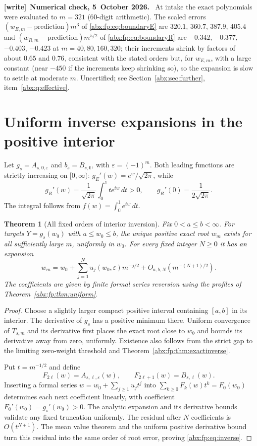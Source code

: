 \documentclass[11pt,letterpaper]{article}
\numberwithin{equation}{section}
\newtheorem{theorem}{Theorem}[section]
\theoremstyle{remark}\newtheorem{remark}[theorem]{Remark}
\newcommand{\eps}{\varepsilon}
\newcommand{\sq}{\sqrt{2\pi}}
\newenvironment{writenote}[1][]{\par\smallskip\begingroup\small
 \noindent\textbf{[write]}\if\relax\detokenize{#1}\relax\else~\textbf{#1.}\fi\ }%
 {\par\endgroup\smallskip}
\begin{document}
\begin{writenote}[Numerical check, 5~October 2026]
At intake the exact polynomials were evaluated to $m=321$ (60-digit arithmetic). The scaled errors $(w_{E,m}-\text{prediction})m^3$ of \eqref{abx:fp:eq:boundaryE} are $320.1$, $360.7$, $387.9$, $405.4$ and $(w_{R,m}-\text{prediction})m^{5/2}$ of \eqref{abx:fp:eq:boundaryR} are $-0.342$, $-0.377$, $-0.403$, $-0.423$ at $m=40,80,160,320$; their increments shrink by factors of about $0.65$ and $0.76$, consistent with the stated orders but, for $w_{E,m}$, with a large constant (near $-450$ if the increments keep shrinking so), so the expansion is slow to settle at moderate $m$. Uncertified; see Section~\ref{abx:sec:further}, item~\ref{abx:q:effective}.
\end{writenote}

\section{Uniform inverse expansions in the positive interior}\label{abx:fp:sec:interior}
Let $g_s=A_{s,0,\eps}$ and $b_s=B_{s,0}$, with $\eps=(-1)^m$.
Both leading functions are strictly increasing on $[0,\infty)$:
$g_E'(w)=e^w/\sq$, while
\[
 g_R'(w)=\frac1{\sq}\int_0^1t e^{tw}\,dt>0,
 \qquad g_R'(0)=\frac1{2\sq}.
\]
The integral follows from $f(w)=\int_0^1 e^{tw}\,dt$.

\begin{theorem}[All fixed orders of interior inversion]\label{abx:fp:thm:inverse}
Fix $0<a\le b<\infty$. For targets $Y=g_s(w_0)$ with
$a\le w_0\le b$, the unique positive exact root $w_m$ exists for
all sufficiently large $m$, uniformly in $w_0$. For every fixed
integer $N\ge0$ it has an expansion
\begin{equation}\label{abx:fp:eq:inverse}
 w_m=w_0+\sum_{j=1}^N u_j(w_0,\eps)m^{-j/2}
                  +O_{a,b,N}(m^{-(N+1)/2}).
\end{equation}
The coefficients are given by finite formal series reversion using
the profiles of Theorem~\ref{abx:fp:thm:uniform}.
\end{theorem}
\begin{proof}
Choose a slightly larger compact positive interval containing $[a,b]$
in its interior. The derivative of $g_s$ has a positive minimum there.
Uniform convergence of $T_{s,m}$ and its derivative first places the
exact root close to $w_0$ and bounds its derivative away from zero,
uniformly. Existence also follows from the strict gap to the limiting
zero-weight threshold and Theorem~\ref{abx:fp:thm:exactinverse}.

Put $t=m^{-1/2}$ and define
\[
 F_{2\ell}(w)=A_{s,\ell,\eps}(w),\qquad
 F_{2\ell+1}(w)=B_{s,\ell}(w).
\]
Inserting a formal series $w=w_0+\sum_{j\ge1}u_jt^j$ into
$\sum_{k\ge0}F_k(w)t^k=F_0(w_0)$ determines each next coefficient
linearly, with coefficient $F_0'(w_0)=g_s'(w_0)>0$.
The analytic expansion and its derivative bounds validate any fixed
truncation uniformly. The residual after $N$ coefficients is
$O(t^{N+1})$. The mean value theorem and the uniform positive derivative
bound turn this residual into the same order of root error, proving
\eqref{abx:fp:eq:inverse}.
\end{proof}
\end{document}
